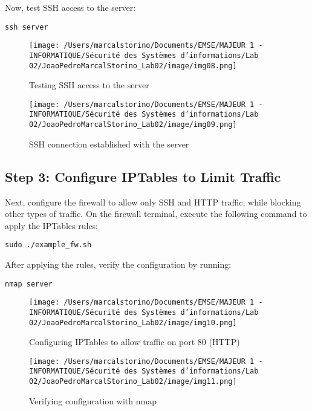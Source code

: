 \documentclass[a4paper,12pt]{article} %
\begin{document}
Now, test SSH access to the server:

\begin{verbatim}
ssh server
\end{verbatim}

\begin{figure}[h!]
\centering
\texttt{[image: /Users/marcalstorino/Documents/EMSE/MAJEUR 1 - INFORMATIQUE/Sécurité des Systèmes d'informations/Lab 02/JoaoPedroMarcalStorino\_Lab02/image/img08.png]} %
\caption{Testing SSH access to the server}
\end{figure}

\begin{figure}[h!]
\centering
\texttt{[image: /Users/marcalstorino/Documents/EMSE/MAJEUR 1 - INFORMATIQUE/Sécurité des Systèmes d'informations/Lab 02/JoaoPedroMarcalStorino\_Lab02/image/img09.png]} %
\caption{SSH connection established with the server}
\end{figure}

\subsection*{Step 3: Configure IPTables to Limit Traffic}
Next, configure the firewall to allow only SSH and HTTP traffic, while blocking other types of traffic. On the firewall terminal, execute the following command to apply the IPTables rules:

\begin{verbatim}
sudo ./example_fw.sh
\end{verbatim}

After applying the rules, verify the configuration by running:

\begin{verbatim}
nmap server
\end{verbatim}

\begin{figure}[h!]
\centering
\texttt{[image: /Users/marcalstorino/Documents/EMSE/MAJEUR 1 - INFORMATIQUE/Sécurité des Systèmes d'informations/Lab 02/JoaoPedroMarcalStorino\_Lab02/image/img10.png]} %
\caption{Configuring IPTables to allow traffic on port 80 (HTTP)}
\end{figure}

\begin{figure}[h!]
\centering
\texttt{[image: /Users/marcalstorino/Documents/EMSE/MAJEUR 1 - INFORMATIQUE/Sécurité des Systèmes d'informations/Lab 02/JoaoPedroMarcalStorino\_Lab02/image/img11.png]} %
\caption{Verifying configuration with nmap}
\end{figure}
\end{document}
